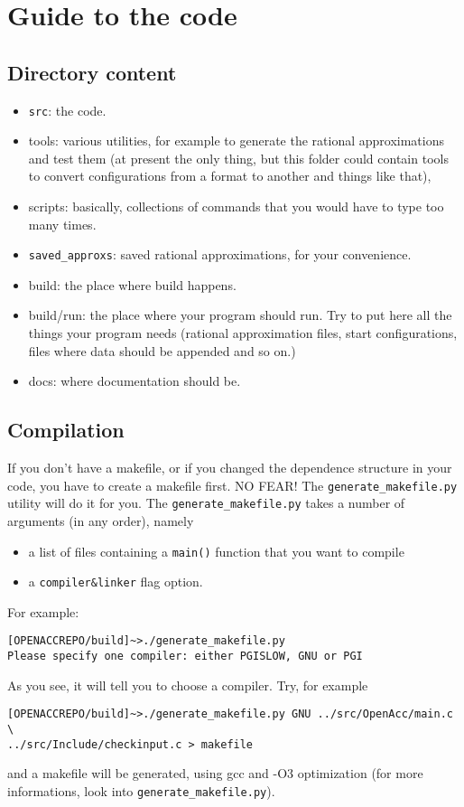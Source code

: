 
\chapter{Guide to the code}

\section{Directory content}

\begin{itemize}
    \item \texttt{src}: the code.
    \item tools: various utilities, for example to generate the rational
        approximations and test them (at present the only thing, but this
        folder could contain tools to convert configurations from a format to
        another and things like that), 
    \item scripts: basically, collections of commands that you would have to
        type too many times.
    \item \verb|saved_approxs|: saved rational approximations, for your 
        convenience. 
    \item build: the place where build happens. 
    \item build/run: the place where your program should run. Try to put here
        all the things your program needs (rational approximation files,
        start configurations, files where data should be appended and so on.)
    \item docs: where documentation should be.
\end{itemize}





\section{Compilation}
\label{compilation}
If you don't have a makefile, or if you changed the dependence
structure in your code, you have to create a makefile first. NO FEAR! The 
\verb|generate_makefile.py| utility will do it for you.
The \verb|generate_makefile.py| takes a number of arguments (in any order), 
namely 
\begin{itemize}
    \item a list of files containing a \verb|main()| function that you want to 
        compile
    \item a \verb|compiler&linker| flag option.
\end{itemize}
For example:
\begin{verbatim}
[OPENACCREPO/build]~>./generate_makefile.py
Please specify one compiler: either PGISLOW, GNU or PGI
\end{verbatim}
As you see, it will tell you to choose a compiler. Try, for example
\begin{verbatim}
[OPENACCREPO/build]~>./generate_makefile.py GNU ../src/OpenAcc/main.c \
../src/Include/checkinput.c > makefile
\end{verbatim}
and a makefile will be generated, using gcc and -O3 optimization
(for more informations, look into \verb|generate_makefile.py|). 


